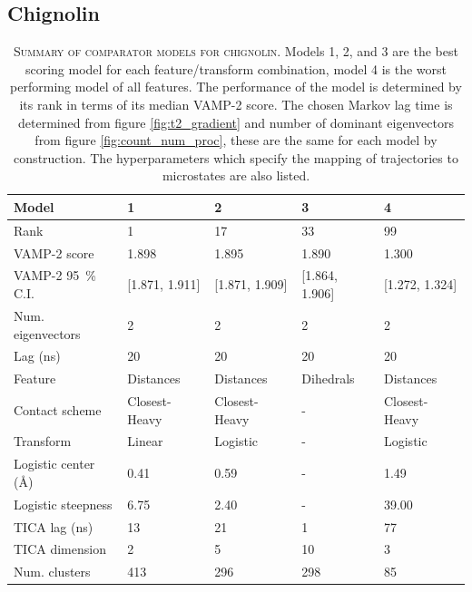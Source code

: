 \documentclass{article}
\begin{document}
\clearpage
\subsection{Chignolin}

\begin{table}[h]
    \centering
    \begin{tabular}{lllll}
    \toprule
    Model &               1 &               2 &               3 &               4 \\
    \midrule
    Rank                             &               1 &              17 &              33 &              99 \\
    VAMP-2 score                     &           1.898 &           1.895 &           1.890 &           1.300 \\
    VAMP-2 \SI{95}{\percent} C.I.    &  [1.871, 1.911] &  [1.871, 1.909] &  [1.864, 1.906] &  [1.272, 1.324] \\
    Num. eigenvectors                &               2 &               2 &               2 &               2 \\
    Lag (ns)                         &              20 &              20 &              20 &              20 \\
    Feature                          &       Distances &       Distances &       Dihedrals &       Distances \\
    Contact scheme                   &   Closest-Heavy &   Closest-Heavy &               - &   Closest-Heavy \\
    Transform                        &          Linear &        Logistic &               - &        Logistic \\
    Logistic center (\si{\angstrom}) &            0.41 &            0.59 &               - &            1.49 \\
    Logistic steepness               &            6.75 &            2.40 &               - &           39.00 \\
    TICA lag (ns)                    &              13 &              21 &               1 &              77 \\
    TICA dimension                   &               2 &               5 &              10 &               3 \\
    Num. clusters                    &             413 &             296 &             298 &              85 \\
    \bottomrule
    \end{tabular}
    \caption{\textsc{Summary of comparator models for chignolin.} Models 1, 2, and 3 are the best scoring model for each feature/transform combination, model 4 is the worst performing model of all features.  The performance of the model is determined by its rank in terms of its median VAMP-2 score.  The chosen Markov lag time is determined from figure \ref{fig:t2_gradient} and number of dominant eigenvectors from figure \ref{fig:count_num_proc}, these are the same for each model by construction. The hyperparameters which specify the mapping of trajectories to microstates are also listed.}
    \label{tab:cln025_mod_defs}
\end{table}
\end{document}
